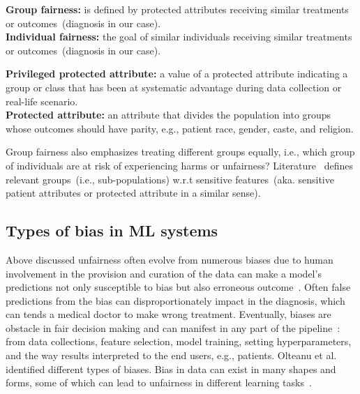 \begin{tcolorbox}[colback=white!3!white,colframe=gray!120!black,title=\faBook~Individual vs. group fairness]
    \scriptsize{
    \textbf{Group fairness:} is defined by protected attributes receiving similar treatments or outcomes~(diagnosis in our case).\\
    \textbf{Individual fairness:} the goal of similar individuals receiving similar treatments or outcomes~(diagnosis in our case).
}
\end{tcolorbox}

\begin{tcolorbox}[colback=white!3!white,colframe=gray!120!black,title=\faBook~Protected attributes]
    \scriptsize{
    \textbf{Privileged protected attribute:} a value of a protected attribute indicating a group or class that has  been at systematic advantage during data collection or real-life scenario. \\
    \textbf{Protected attribute:} an attribute that divides the population into groups whose outcomes should have parity, e.g., patient race, gender, caste, and religion.
}
\end{tcolorbox}

\hspace*{3.5mm} Group fairness also emphasizes treating different groups equally, i.e., which group of individuals are at risk of experiencing harms or unfairness? Literature~\cite{verma2018fairness} defines relevant groups~(i.e., sub-populations) w.r.t sensitive features~(aka. sensitive patient attributes or protected attribute in a similar sense).

\subsection{Types of bias in ML systems}
Above discussed unfairness often evolve from numerous biases due to human involvement in the provision and curation of the data can make a model's predictions not only susceptible to bias but also erroneous outcome~\cite{futia2020integration}. Often false predictions from the bias can disproportionately impact in the diagnosis, which can tends a medical doctor to make wrong treatment. Eventually, biases are obstacle in fair decision making and can manifest in any part of the pipeline~\cite{GoogleBiasinMLPipeline,fairness_survey}: from data collections, feature selection, model training, setting hyperparameters, and the way results  interpreted to the end users, e.g., patients. Olteanu et al.~\cite{biasList} identified different types of biases. Bias in data can exist in many shapes and forms, some of which can lead to unfairness in different learning tasks~\cite{fairness_survey}. 

